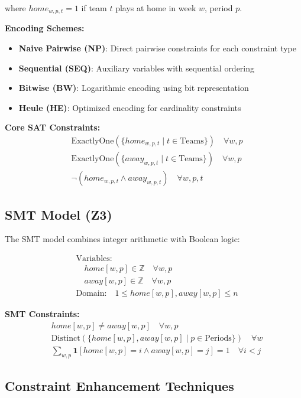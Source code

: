 \documentclass[11pt]{article}
\begin{document}
where $home_{w,p,t} = 1$ if team $t$ plays at home in week $w$, period $p$.

\textbf{Encoding Schemes:}
\begin{itemize}
    \item \textbf{Naive Pairwise (NP)}: Direct pairwise constraints for each constraint type
    \item \textbf{Sequential (SEQ)}: Auxiliary variables with sequential ordering
    \item \textbf{Bitwise (BW)}: Logarithmic encoding using bit representation
    \item \textbf{Heule (HE)}: Optimized encoding for cardinality constraints
\end{itemize}

\textbf{Core SAT Constraints:}
\begin{align}
&\text{ExactlyOne}(\{home_{w,p,t} \mid t \in \text{Teams}\}) \quad \forall w,p \\
&\text{ExactlyOne}(\{away_{w,p,t} \mid t \in \text{Teams}\}) \quad \forall w,p \\
&\neg(home_{w,p,t} \land away_{w,p,t}) \quad \forall w,p,t
\end{align}

\subsection{SMT Model (Z3)}

The SMT model combines integer arithmetic with Boolean logic:

\begin{align}
&\text{Variables:} \\
&\quad home[w,p] \in \mathbb{Z} \quad \forall w,p \\
&\quad away[w,p] \in \mathbb{Z} \quad \forall w,p \\
&\text{Domain:} \quad 1 \leq home[w,p], away[w,p] \leq n
\end{align}

\textbf{SMT Constraints:}
\begin{align}
&home[w,p] \neq away[w,p] \quad \forall w,p \\
&\text{Distinct}(\{home[w,p], away[w,p] \mid p \in \text{Periods}\}) \quad \forall w \\
&\sum_{w,p} \mathbf{1}[home[w,p] = i \land away[w,p] = j] = 1 \quad \forall i < j
\end{align}

\subsection{Constraint Enhancement Techniques}
\end{document}
